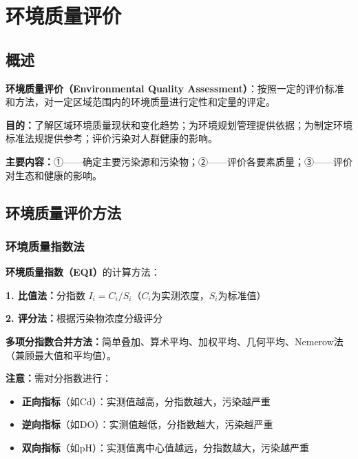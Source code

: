 \documentclass[10pt,a4paper,oneside]{ctexbook}
\begin{document}
\chapter{环境质量评价}
\setcounter{chapter}{11}

\section{概述}

\begin{defbox}
\textbf{环境质量评价（Environmental Quality Assessment）}：按照一定的评价标准和方法，对一定区域范围内的环境质量进行定性和定量的评定。
\end{defbox}

\textbf{目的：}了解区域环境质量现状和变化趋势；为环境规划管理提供依据；为制定环境标准法规提供参考；评价污染对人群健康的影响。

\textbf{主要内容：}①——确定主要污染源和污染物；②——评价各要素质量；③——评价对生态和健康的影响。

\section{环境质量评价方法}

\subsection{环境质量指数法}

\begin{keybox}
\textbf{环境质量指数（EQI）}的计算方法：

\textbf{1. 比值法：}分指数 $I_i = C_i / S_i$（$C_i$为实测浓度，$S_i$为标准值）

\textbf{2. 评分法：}根据污染物浓度分级评分

\textbf{多项分指数合并方法：}简单叠加、算术平均、加权平均、几何平均、Nemerow法（兼顾最大值和平均值）。

\textbf{注意：}需对分指数进行：
\begin{itemize}[leftmargin=*]
    \item \textbf{正向指标}（如Cd）：实测值越高，分指数越大，污染越严重
    \item \textbf{逆向指标}（如DO）：实测值越低，分指数越大，污染越严重
    \item \textbf{双向指标}（如pH）：实测值离中心值越远，分指数越大，污染越严重
\end{itemize}
\end{keybox}
\end{document}
